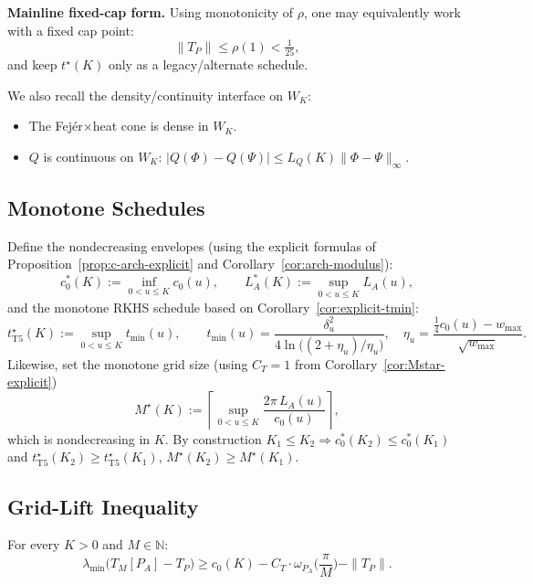 \noindent\textbf{Mainline fixed-cap form.}
Using monotonicity of $\rho$, one may equivalently work with a fixed cap point:
\[
  \|T_P\| \le \rho(1) < \tfrac{1}{25},
\]
and keep $t^\star(K)$ only as a legacy/alternate schedule.

We also recall the density/continuity interface on $W_K$:
\begin{itemize}
  \item[\textbf{(A1')}] The Fej\'er$\times$heat cone is dense in $W_K$.
  \item[\textbf{(A2)}] $Q$ is continuous on $W_K$: $|Q(\Phi) - Q(\Psi)| \leq L_Q(K) \|\Phi - \Psi\|_\infty$.
\end{itemize}

\subsection{Monotone Schedules}

Define the nondecreasing envelopes (using the explicit formulas of Proposition~\ref{prop:c-arch-explicit} and Corollary~\ref{cor:arch-modulus}):
\begin{equation}
  c_0^\ast(K) := \inf_{0 < u \leq K} c_0(u), \qquad
  L_A^\ast(K) := \sup_{0 < u \leq K} L_A(u),
\end{equation}
and the monotone RKHS schedule based on Corollary~\ref{cor:explicit-tmin}:
\begin{equation}\label{eq:T5-tstar}
  t^\star_{\mathrm{T5}}(K) := \sup_{0 < u \leq K} t_{\min}(u),
  \qquad
  t_{\min}(u) = \frac{\delta_u^2}{4 \ln\!\bigl((2+\eta_u)/\eta_u\bigr)}, \quad
  \eta_u = \frac{\tfrac14 c_0(u) - w_{\max}}{\sqrt{w_{\max}}}.
\end{equation}
Likewise, set the monotone grid size (using $C_T=1$ from Corollary~\ref{cor:Mstar-explicit})
\begin{equation}\label{eq:T5-Mstar}
  M^\star(K) := \left\lceil \sup_{0 < u \leq K} \frac{2\pi\, L_A(u)}{c_0(u)} \right\rceil,
\end{equation}
which is nondecreasing in $K$. By construction $K_1 \leq K_2 \Rightarrow c_0^\ast(K_2) \leq c_0^\ast(K_1)$ and $t^\star_{\mathrm{T5}}(K_2) \geq t^\star_{\mathrm{T5}}(K_1)$, $M^\star(K_2) \geq M^\star(K_1)$.

\subsection{Grid-Lift Inequality}

\begin{lemma}\label{lem:T5-grid}
For every $K > 0$ and $M \in \mathbb{N}$:
\begin{equation}
  \lambda_{\min}\!\big(T_M[P_A] - T_P\big) \geq c_0(K) - C_T \cdot \omega_{P_A}\!\Big(\frac{\pi}{M}\Big) - \|T_P\|.
\end{equation}
\end{lemma}

